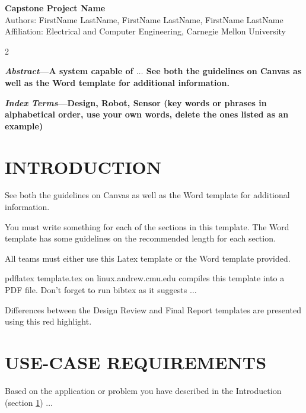 \documentclass[10pt]{article}
\begin{document}
\begin{center}
    \Huge{\textbf{Capstone Project Name}} \\
    \vspace*{0.15in}
    \normalsize{Authors: FirstName LastName, FirstName LastName, FirstName LastName} \\
    \normalsize{Affiliation: Electrical and Computer Engineering, Carnegie Mellon University}
\end{center}
\vspace*{0.05in}
\begin{multicols*}{2}
{\small 
    \textbf{
        \emph{Abstract}---A system capable of $\ldots$ See both the guidelines on Canvas as well as the Word template for additional information. \\
        } 
\par}

{\small
    \textbf{
        \emph{Index Terms}---Design, Robot, Sensor (key words or phrases in alphabetical order, use your own words, delete the ones listed as an example) \\
    }
\par}


\section{INTRODUCTION} \label{introduction}
See both the guidelines on Canvas as well as the Word template for additional information.

You must write something for each of the sections in this template. The Word template has some guidelines on the recommended length for each section.

All teams must either use this Latex template or the Word template provided.

pdflatex template.tex on linux.andrew.cmu.edu compiles this template into a PDF file. Don't forget to run bibtex as it suggests $\ldots$

{\color{red} Differences between the Design Review and Final Report templates are presented using this red highlight.}

\section{USE-CASE REQUIREMENTS} \label{use-case-requirements}
Based on the application or problem you have described in the Introduction (section \ref{introduction}) $\ldots$



\end{multicols*}
\end{document}
